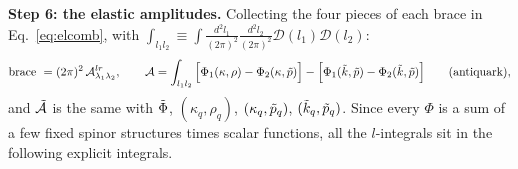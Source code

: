 \documentclass[9pt]{article}
\numberwithin{equation}{section}
\begin{document}
\noindent\textbf{Step 6: the elastic amplitudes.} Collecting the four pieces of each brace in Eq.~\eqref{eq:elcomb}, with $\int_{l_{1}l_{2}}\equiv\int\frac{d^{2}l_{1}}{(2\pi)^{2}}\frac{d^{2}l_{2}}{(2\pi)^{2}}\mathcal{D}(l_{1})\mathcal{D}(l_{2})$:
\begin{align}
\text{brace}\ = (2\pi)^{2}\,\mathcal{A}^{lr}_{\lambda_{1}\lambda_{2}},\hspace{2em} \mathcal{A} = \int_{l_{1}l_{2}}\Big[\Phi_{1}(\kappa,\rho)-\Phi_{2}(\kappa,\Tilde{p})\Big]-\Big[\Phi_{1}(\Tilde{k},\Tilde{p})-\Phi_{2}(\Tilde{k},\Tilde{p})\Big]\hspace{2em}\text{(antiquark)},
\end{align}
and $\Tilde{\mathcal{A}}$ is the same with $\Tilde{\Phi}$, $(\kappa_{q},\rho_{q})$, $(\kappa_{q},\Tilde{p}_{q})$, $(\Tilde{k}_{q},\Tilde{p}_{q})$. Since every $\Phi$ is a sum of a few fixed spinor structures times scalar functions, all the $l$-integrals sit in the following explicit integrals.
\end{document}
